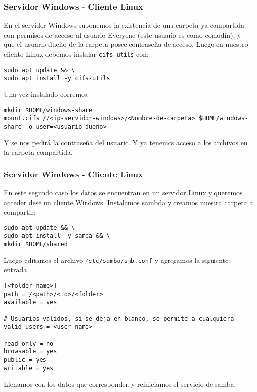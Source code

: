 \subsubsection{Servidor Windows - Cliente Linux}

En el servidor Windows suponemos la existencia de una carpeta ya compartida con permisos de acceso al usuario Everyone (este usuario es como comodín), y que el usuario dueño de la carpeta posee contraseña de acceso. Luego en nuestro cliente Linux debemos instalar \texttt{cifs-utils} con:

\begin{lstlisting}[bash]
sudo apt update && \
sudo apt install -y cifs-utils
\end{lstlisting}

Una vez instalado corremos:

\begin{lstlisting}[bash]
mkdir $HOME/windows-share
mount.cifs //<ip-servidor-windows>/<Nombre-de-carpeta> $HOME/windows-share -o user=<usuario-dueño>
\end{lstlisting}

Y se nos pedirá la contraseña del usuario. Y ya tenemos acceso a los archivos en la carpeta compartida.

\subsubsection{Servidor Windows - Cliente Linux}

En este segundo caso los datos se encuentran en un servidor Linux y queremos acceder dese un cliente Windows. Instalamos sambda y creamos nuestra carpeta a compartir:

\begin{lstlisting}[bash]
sudo apt update && \
sudo apt install -y samba && \
mkdir $HOME/shared
\end{lstlisting}

Luego editamos el archivo \texttt{/etc/samba/smb.conf} y agregamos la siguiente entrada

\begin{lstlisting}
[<folder_name>]
path = /<path>/<to>/<folder>
available = yes

# Usuarios validos, si se deja en blanco, se permite a cualquiera
valid users = <user_name>

read only = no 
browsable = yes 
public = yes 
writable = yes
\end{lstlisting}

Llenamos con los datos que corresponden y reiniciamos el servicio de samba:

